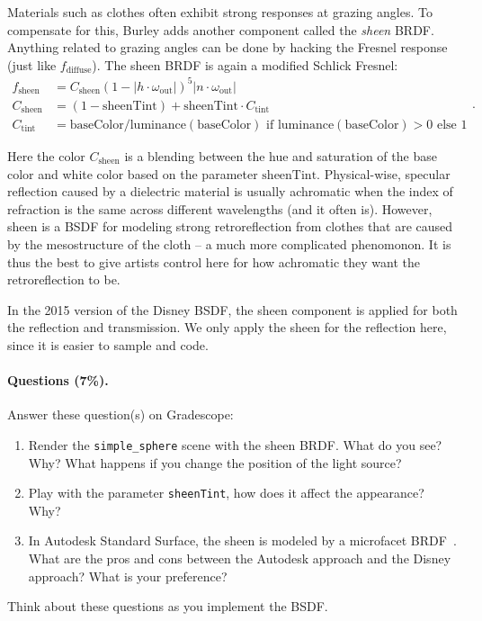 Materials such as clothes often exhibit strong responses at grazing angles. To compensate for this, Burley adds another component called the \emph{sheen} BRDF. Anything related to grazing angles can be done by hacking the Fresnel response (just like $f_{\text{diffuse}}$). The sheen BRDF is again a modified Schlick Fresnel:
\begin{equation}
\begin{aligned}
f_{\text{sheen}} &= C_{\text{sheen}} (1 - |h \cdot \omega_{\text{out}}|)^5 |n \cdot \omega_{\text{out}}| \\
C_{\text{sheen}} &= \left(1 - \text{sheenTint}\right) + \text{sheenTint} \cdot C_{\text{tint}} \\
C_{\text{tint}} &= \text{baseColor} / \text{luminance}(\text{baseColor}) \text{ if } \text{luminance}(\text{baseColor}) > 0 \text{ else } 1
\end{aligned}.
\label{eq:f_sheen}
\end{equation}

Here the color $C_{\text{sheen}}$ is a blending between the hue and saturation of the base color and white color based on the parameter $\text{sheenTint}$.
Physical-wise, specular reflection caused by a dielectric material is usually achromatic when the index of refraction is the same across different wavelengths (and it often is). However, sheen is a BSDF for modeling strong retroreflection from clothes that are caused by the mesostructure of the cloth -- a much more complicated phenomonon. It is thus the best to give artists control here for how achromatic they want the retroreflection to be.

In the 2015 version of the Disney BSDF, the sheen component is applied for both the reflection and transmission. We only apply the sheen for the reflection here, since it is easier to sample and code.

\paragraph{Questions (7\%).} Answer these question(s) on Gradescope:
\begin{enumerate}
    \item Render the \lstinline{simple_sphere} scene with the sheen BRDF. What do you see? Why? What happens if you change the position of the light source?
    \item Play with the parameter \lstinline{sheenTint}, how does it affect the appearance? Why?
    \item In Autodesk Standard Surface, the sheen is modeled by a microfacet BRDF~\cite{Estevez:2017:PFM}. What are the pros and cons between the Autodesk approach and the Disney approach? What is your preference?
\end{enumerate}
Think about these questions as you implement the BSDF.

